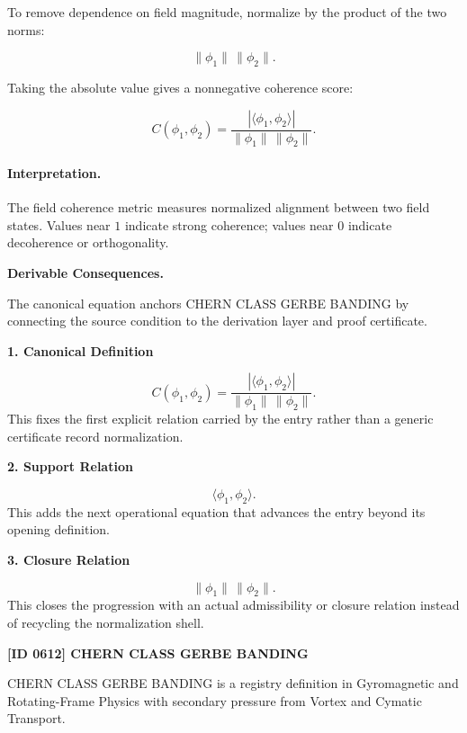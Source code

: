 To remove dependence on field magnitude, normalize by the product of the two norms:

\begin{equation}
\lVert \phi_1\rVert\,\lVert \phi_2\rVert .
\end{equation}

Taking the absolute value gives a nonnegative coherence score:

\begin{equation}
\boxed{
C(\phi_1,\phi_2)
=
\frac{
\left|\langle \phi_1,\phi_2\rangle\right|
}{
\lVert \phi_1\rVert\,\lVert \phi_2\rVert
}.
}
\end{equation}

\paragraph{Interpretation.}
The field coherence metric measures normalized alignment between two field states. Values near $1$ indicate strong coherence; values near $0$ indicate decoherence or orthogonality.

\par\vspace{0.35em}
\noindent\textbf{Derivable Consequences.}\quad
\begingroup
\footnotesize
\raggedright
The canonical equation anchors CHERN CLASS GERBE BANDING by connecting the source condition to the derivation layer and proof certificate.
\par\endgroup

\noindent\textbf{1. Canonical Definition}\par
\[
C(\phi_1,\phi_2) = \frac{ \left|\langle \phi_1,\phi_2\rangle\right| }{ \lVert \phi_1\rVert\,\lVert \phi_2\rVert }.
\]
\noindent This fixes the first explicit relation carried by the entry rather than a generic certificate record normalization.\par
\noindent\textbf{2. Support Relation}\par
\[
\langle \phi_1,\phi_2\rangle.
\]
\noindent This adds the next operational equation that advances the entry beyond its opening definition.\par
\noindent\textbf{3. Closure Relation}\par
\[
\lVert \phi_1\rVert\,\lVert \phi_2\rVert.
\]
\noindent This closes the progression with an actual admissibility or closure relation instead of recycling the normalization shell.\par

\clearpage
\noindent\textbf{[ID 0612] CHERN CLASS GERBE BANDING}\par
\vspace{0.35em}
\begingroup\small
{}
CHERN CLASS GERBE BANDING is a registry definition in Gyromagnetic and Rotating-Frame Physics with secondary pressure from Vortex and Cymatic Transport.


